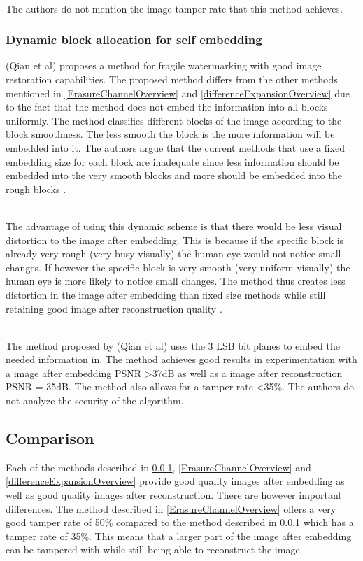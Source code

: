 \documentclass[12pt]{article}
\begin{document}
\hspace{0pt} \\ 
The authors do not mention the image tamper rate that this method \cite {tian2003high} achieves.

\subsubsection{Dynamic block allocation for self embedding}
\label{DynamicBlockOverview}
(Qian et al) \cite{qian2011image} proposes a method for fragile watermarking with good image restoration capabilities.
The proposed method differs from the other methods mentioned in \ref{ErasureChannelOverview} and \ref{differenceExpansionOverview} due to the fact that the method does not embed the information into all blocks uniformly.
The method classifies different blocks of the image according to the block smoothness.
The less smooth the block is the more information will be embedded into it.
The authors argue that the current methods that use a fixed embedding size for each block are inadequate since less information should be embedded into the very smooth blocks and more should be embedded into the rough blocks \cite{qian2011image}.

\hspace{0pt} \\
The advantage of using this dynamic scheme is that there would be less visual distortion to the image after embedding. 
This is because if the specific block is already very rough (very busy visually) the human eye would not notice small changes.
If however the specific block is very smooth (very uniform visually) the human eye is more likely to notice small changes.
The method thus creates less distortion in the image after embedding than fixed size methods while still retaining good image after reconstruction quality \cite{qian2011image}. 

\hspace{0pt} \\
The method proposed by (Qian et al) \cite{qian2011image} uses the 3 LSB bit planes to embed the needed information in.
The method achieves good results in experimentation with a image after embedding PSNR \textgreater 37dB as well as a image after reconstruction PSNR = 35dB.
The method also allows for a tamper rate \textless 35\%.
The authors do not analyze the security of the algorithm.

\subsection{Comparison}
Each of the methods described in \ref{DynamicBlockOverview}, \ref{ErasureChannelOverview} and \ref{differenceExpansionOverview} provide good quality images after embedding as well as good quality images after reconstruction.
There are however important differences.
The method described in \ref{ErasureChannelOverview} offers a very good tamper rate of 50\% compared to the method described in \ref{DynamicBlockOverview} which has a tamper rate of 35\%.
This means that a larger part of the image after embedding can be tampered with while still being able to reconstruct the image.
\end{document}
